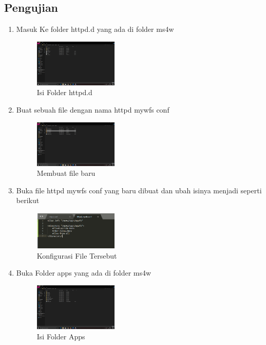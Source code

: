 \subsection{Pengujian}
\begin{enumerate}
  \item Masuk Ke folder httpd.d yang ada di folder ms4w
  \hfill\break
    \begin{figure}[H]
		\includegraphics[width=4cm]{figures/1174031/4/12.png}
		\centering
		\caption{Isi Folder httpd.d}
    \end{figure}
  \item Buat sebuah file dengan nama httpd mywfs conf
  \hfill\break
    \begin{figure}[H]
		\includegraphics[width=4cm]{figures/1174031/4/13.png}
		\centering
		\caption{Membuat file baru}
    \end{figure}
  \item Buka file httpd mywfs conf yang baru dibuat dan ubah isinya menjadi seperti berikut
  \hfill\break
    \begin{figure}[H]
		\includegraphics[width=4cm]{figures/1174031/4/14.png}
		\centering
		\caption{Konfigurasi File Tersebut}
    \end{figure}
  \item Buka Folder apps yang ada di folder ms4w
  \hfill\break
    \begin{figure}[H]
		\includegraphics[width=4cm]{figures/1174031/4/15.png}
		\centering
		\caption{Isi Folder Apps}
    \end{figure}

\end{enumerate}
